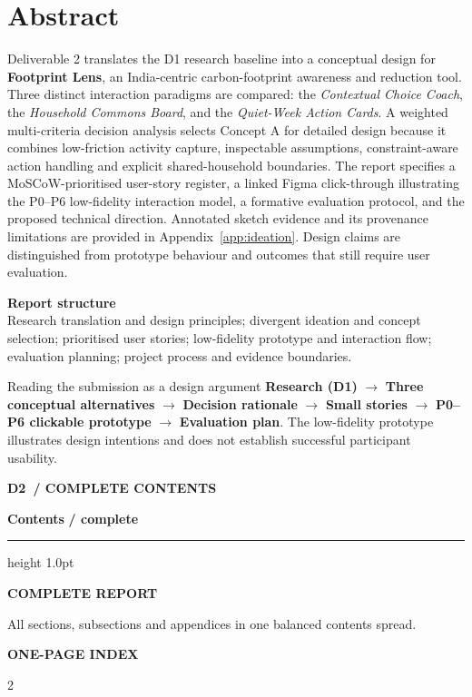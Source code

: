\documentclass[12pt,a4paper]{article}
\newcommand{\tocpagehead}[4]{%
  \noindent{\sffamily\footnotesize\bfseries\color{Teal}FOOTPRINT LENS}\hfill
  {\sffamily\footnotesize\bfseries\color{Slate}D2\ / COMPLETE CONTENTS}\par
  \vspace{0.52cm}
  {\sffamily\fontsize{29}{33}\selectfont\bfseries\color{Navy}Contents}\hfill
  {\sffamily\fontsize{17}{20}\selectfont\bfseries\color{Teal}#2}\par
  \vspace{0.22cm}
  {\color{Teal}\hrule height 1.0pt}\par
  \vspace{0.44cm}
  \noindent
  \begin{minipage}[c]{0.74\linewidth}
    {\sffamily\footnotesize\bfseries\color{Teal}\MakeUppercase{#3}}\par
    \vspace{0.1cm}
    {\sffamily\small\color{Slate}#4}\par
  \end{minipage}\hfill
  \begin{minipage}[c]{0.22\linewidth}
    \raggedleft
    {\sffamily\footnotesize\bfseries\color{Teal}ONE-PAGE INDEX}
  \end{minipage}\par
  \vspace{0.46cm}
}
\begin{document}
\clearpage
\section*{Abstract}
Deliverable 2 translates the D1 research baseline into a conceptual design for \textbf{Footprint Lens}, an India-centric carbon-footprint awareness and reduction tool. Three distinct interaction paradigms are compared: the \emph{Contextual Choice Coach}, the \emph{Household Commons Board}, and the \emph{Quiet-Week Action Cards}. A weighted multi-criteria decision analysis selects Concept A for detailed design because it combines low-friction activity capture, inspectable assumptions, constraint-aware action handling and explicit shared-household boundaries. The report specifies a MoSCoW-prioritised user-story register, a linked Figma click-through illustrating the P0--P6 low-fidelity interaction model, a formative evaluation protocol, and the proposed technical direction. Annotated sketch evidence and its provenance limitations are provided in Appendix~\ref{app:ideation}. Design claims are distinguished from prototype behaviour and outcomes that still require user evaluation.

\vspace{0.4cm}
\begin{keybox}
\textbf{\sffamily\color{Navy}Report structure}\\
Research translation and design principles; divergent ideation and concept selection; prioritised user stories; low-fidelity prototype and interaction flow; evaluation planning; project process and evidence boundaries.
\end{keybox}

\begin{chapterfocus}{Reading the submission as a design argument}
\textbf{Research (D1)} $\rightarrow$ \textbf{Three conceptual alternatives} $\rightarrow$ \textbf{Decision rationale} $\rightarrow$ \textbf{Small stories} $\rightarrow$ \textbf{P0--P6 clickable prototype} $\rightarrow$ \textbf{Evaluation plan}. The low-fidelity prototype illustrates design intentions and does not establish successful participant usability.
\end{chapterfocus}

\clearpage
\begingroup
\setlength{\parskip}{0pt}
\tocpagehead{01}{/ complete}{Complete report}{All sections, subsections and appendices in one balanced contents spread.}
\begin{multicols}{2}
\setlength{\columnsep}{0.75cm}
\setlength{\columnseprule}{0.35pt}
\def\columnseprulecolor{\color{RuleGray}}
\makeatletter{}\makeatother
\end{multicols}
\endgroup
\clearpage
{}
\setcounter{page}{1}
\end{document}
